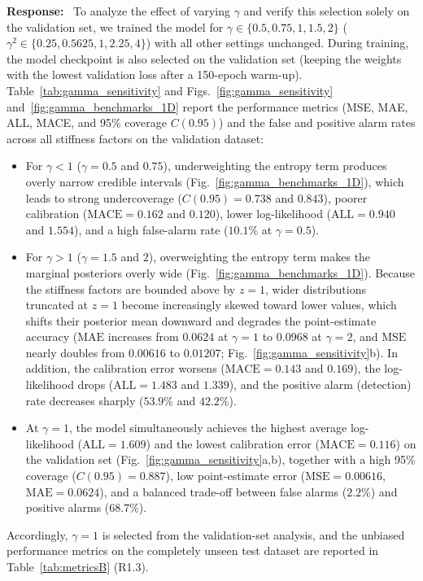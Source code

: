 \documentclass[11pt]{article}
\newenvironment{response}{\par\smallskip\noindent\color{resp}\textbf{Response:}\ }{\par}
\begin{document}
\begin{response}
To analyze the effect of varying $\gamma$ and verify this selection solely on the validation set, we trained the model
for $\gamma\in\{0.5,0.75,1,1.5,2\}$ ($\gamma^2\in\{0.25,0.5625,1,2.25,4\}$) with all other settings unchanged. During
training, the model checkpoint is also selected on the validation set (keeping the weights with the lowest validation
loss after a 150-epoch warm-up). Table~\ref{tab:gamma_sensitivity} and Figs.~\ref{fig:gamma_sensitivity}
and~\ref{fig:gamma_benchmarks_1D} report the performance metrics (MSE, MAE, ALL, MACE, and 95\% coverage $C(0.95)$) and
the false and positive alarm rates across all stiffness factors on the validation dataset:
\begin{itemize}[leftmargin=*]
\item For $\gamma<1$ ($\gamma=0.5$ and $0.75$), underweighting the entropy term produces overly narrow credible
intervals (Fig.~\ref{fig:gamma_benchmarks_1D}), which leads to strong undercoverage ($C(0.95)=0.738$ and $0.843$),
poorer calibration ($\mathrm{MACE}=0.162$ and $0.120$), lower log-likelihood ($\mathrm{ALL}=0.940$ and $1.554$), and a
high false-alarm rate ($10.1\%$ at $\gamma=0.5$).
\item For $\gamma>1$ ($\gamma=1.5$ and $2$), overweighting the entropy term makes the marginal posteriors overly wide
(Fig.~\ref{fig:gamma_benchmarks_1D}). Because the stiffness factors are bounded above by $z=1$, wider distributions
truncated at $z=1$ become increasingly skewed toward lower values, which shifts their posterior mean downward and
degrades the point-estimate accuracy ($\mathrm{MAE}$ increases from $0.0624$ at $\gamma=1$ to $0.0968$ at $\gamma=2$,
and $\mathrm{MSE}$ nearly doubles from $0.00616$ to $0.01207$; Fig.~\ref{fig:gamma_sensitivity}b). In addition, the
calibration error worsens ($\mathrm{MACE}=0.143$ and $0.169$), the log-likelihood drops ($\mathrm{ALL}=1.483$ and
$1.339$), and the positive alarm (detection) rate decreases sharply ($53.9\%$ and $42.2\%$).
\item At $\gamma=1$, the model simultaneously achieves the highest average log-likelihood ($\mathrm{ALL}=1.609$) and the
lowest calibration error ($\mathrm{MACE}=0.116$) on the validation set (Fig.~\ref{fig:gamma_sensitivity}a,b), together
with a high 95\% coverage ($C(0.95)=0.887$), low point-estimate error ($\mathrm{MSE}=0.00616$, $\mathrm{MAE}=0.0624$),
and a balanced trade-off between false alarms ($2.2\%$) and positive alarms ($68.7\%$).
\end{itemize}
Accordingly, $\gamma=1$ is selected from the validation-set analysis, and the unbiased performance metrics on the
completely unseen test dataset are reported in Table~\ref{tab:metricsB} (R1.3).
\end{response}
\end{document}
